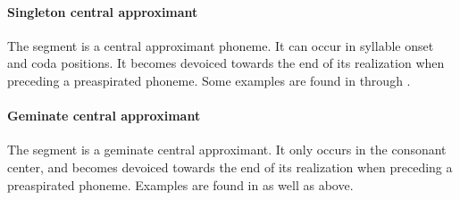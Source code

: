 \paragraph{Singleton central approximant}
The segment  is a central approximant phoneme. It can occur in syllable onset and coda positions. 
It becomes devoiced \ipa{[jj̥]} towards the end of its realization when preceding a preaspirated phoneme. 
Some examples are found in  through . 
%

\paragraph{Geminate central approximant}
The segment  is a geminate central approximant. It only occurs in the consonant center, and becomes devoiced \ipa{[jj̥ː]} towards the end of its realization when preceding a preaspirated phoneme.  
Examples are found in  as well as  above.

